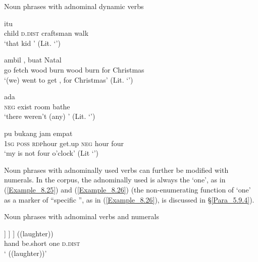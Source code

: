 \begin{styleExampleTitle}
Noun phrases with adnominal dynamic verbs
\end{styleExampleTitle}
\ea
\label{Example_8.21}
 {itu} {} {}\\ %
 child  \textsc{d.dist}  craftsman  walk\\
\glt 
‘that kid ’ (Lit. ‘’) \textstyleExampleSource{[080927-001-Cv.0007]}
\z

\ea
\label{Example_8.22}
 {ambil} {} {,} {} {} {buat} {Natal}\\ %
 go  fetch  wood  burn  wood  burn  for  Christmas\\
\glt 
‘(we) went to get ,  for Christmas’ (Lit. ‘’) \textstyleExampleSource{[081006-017-Cv.0014]}
\z

\ea
\label{Example_8.23}
 {ada} {} {}\\ %
 \textsc{neg}  exist  room  bathe\\
\glt 
‘there weren’t (any) ’ (Lit. ‘’) \textstyleExampleSource{[081025-009a-Cv.0059]}
\z

\ea
\label{Example_8.24}
 {pu} {} {} {bukang} {jam} {empat}\\ %
 \textsc{1sg}  \textsc{poss}  \textsc{rdp}{\Tilde}hour  get.up  \textsc{neg}  hour  four\\
\glt 
‘my  is not four o’clock’ (Lit ‘’) \textstyleExampleSource{[081025-006-Cv.0061]}
\z

Noun phrases with adnominally used verbs can further be modified with numerals. In the corpus, the adnominally used  is always the   ‘one’, as in (\ref{Example_8.25}) and (\ref{Example_8.26}) (the non-enumerating function of  ‘one’ as a marker of ``specific '', as in (\ref{Example_8.26}), is discussed in §\ref{Para_5.9.4}).

\begin{styleExampleTitle}
Noun phrases with adnominal verbs and numerals
\end{styleExampleTitle}
\ea
\label{Example_8.25}
\gll {[[[\bluebold{tangang}} {]} {]} {]} {((laughter))}\\ %
 hand  be.short  one  \textsc{d.dist}  \\
 ‘ ((laughter))’ \textstyleExampleSource{[081006-016-Cv.0036]}
\z

